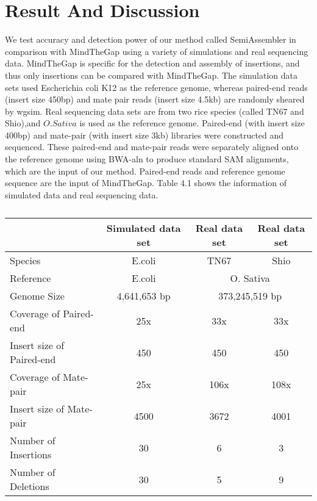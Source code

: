 \graphicspath{ {Chapters/images/} }
\chapter{Result And Discussion}

We test accuracy and detection power of our method called SemiAssembler in comparison with MindTheGap using a variety of simulations and real sequencing data. MindTheGap is specific for the detection and assembly of insertions, and thus only insertions can be compared with MindTheGap.   
The simulation data sets used Escherichia coli K12 as the reference genome, whereas paired-end reads (insert size 450bp) and mate pair reads (insert size 4.5kb) are randomly sheared by wgsim. Real sequencing data sets are from two rice species (called TN67 and Shio),and $O. Sativa$ is used as the reference genome. Paired-end (with insert size 400bp) and mate-pair (with insert size 3kb) libraries were constructed and sequenced. These paired-end and mate-pair reads were separately aligned onto the reference genome using BWA-aln to produce standard SAM alignments, which are the input of our method. Paired-end reads and reference genome sequence are the input of MindTheGap. Table 4.1 shows the information of simulated data and real sequencing data. 

\begin{table}[!ht]
    \centering
    \begin{tabular}[t]{l|c|c|c|}
      & Simulated data set & Real data set & Real data set  \\
      \hline
      Species & {E.coli} & {TN67} & {Shio} \\
      Reference & E.coli &  \multicolumn{2}{|c|}{O. Sativa} \\     
      \cline{3-4}
      Genome Size & 4,641,653 bp &  \multicolumn{2}{|c|}{373,245,519 bp} \\
      \cline{3-4}
      Coverage of Paired-end & 25x & 33x & 33x \\
      Insert size of Paired-end & 450 & 450 & 450 \\
      Coverage of Mate-pair & 25x & 106x & 108x \\
      Insert size of Mate-pair & 4500 & 3672 & 4001 \\
      Number of Insertions & 30 & 6 & 3 \\ 
      Number of Deletions & 30 & 5 & 9 \\ 

      
   \end{tabular}
    \caption{}
    \label{}
\end{table}


